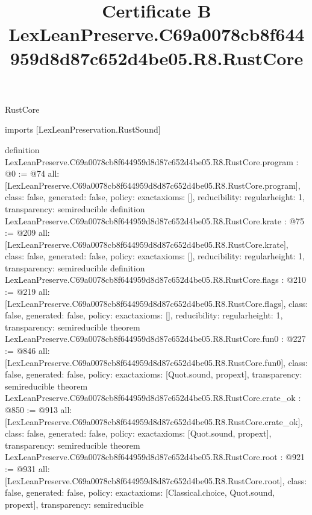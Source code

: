 \begin{lexlean}{RustCore}
\title{Certificate B LexLeanPreserve.C69a0078cb8f644959d8d87c652d4be05.R8.RustCore}
\begin{coremodule}
imports [LexLeanPreservation.RustSound]

definition LexLeanPreserve.C69a0078cb8f644959d8d87c652d4be05.R8.RustCore.program : @0 := @74 {
  all: [LexLeanPreserve.C69a0078cb8f644959d8d87c652d4be05.R8.RustCore.program],
  class: false,
  generated: false,
  policy: exact{axioms: []},
  reducibility: regular{height: 1},
  transparency: semireducible
}
definition LexLeanPreserve.C69a0078cb8f644959d8d87c652d4be05.R8.RustCore.krate : @75 := @209 {
  all: [LexLeanPreserve.C69a0078cb8f644959d8d87c652d4be05.R8.RustCore.krate],
  class: false,
  generated: false,
  policy: exact{axioms: []},
  reducibility: regular{height: 1},
  transparency: semireducible
}
definition LexLeanPreserve.C69a0078cb8f644959d8d87c652d4be05.R8.RustCore.flags : @210 := @219 {
  all: [LexLeanPreserve.C69a0078cb8f644959d8d87c652d4be05.R8.RustCore.flags],
  class: false,
  generated: false,
  policy: exact{axioms: []},
  reducibility: regular{height: 1},
  transparency: semireducible
}
theorem LexLeanPreserve.C69a0078cb8f644959d8d87c652d4be05.R8.RustCore.fun0 : @227 := @846 {
  all: [LexLeanPreserve.C69a0078cb8f644959d8d87c652d4be05.R8.RustCore.fun0],
  class: false,
  generated: false,
  policy: exact{axioms: [Quot.sound, propext]},
  transparency: semireducible
}
theorem LexLeanPreserve.C69a0078cb8f644959d8d87c652d4be05.R8.RustCore.crate_ok : @850 := @913 {
  all: [LexLeanPreserve.C69a0078cb8f644959d8d87c652d4be05.R8.RustCore.crate_ok],
  class: false,
  generated: false,
  policy: exact{axioms: [Quot.sound, propext]},
  transparency: semireducible
}
theorem LexLeanPreserve.C69a0078cb8f644959d8d87c652d4be05.R8.RustCore.root : @921 := @931 {
  all: [LexLeanPreserve.C69a0078cb8f644959d8d87c652d4be05.R8.RustCore.root],
  class: false,
  generated: false,
  policy: exact{axioms: [Classical.choice, Quot.sound, propext]},
  transparency: semireducible
}


\end{coremodule}
\end{lexlean}
